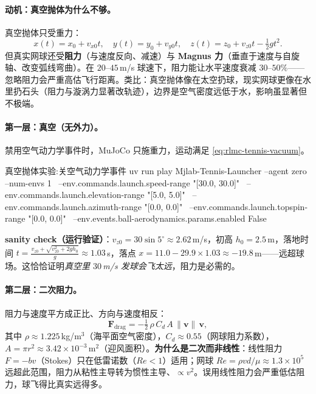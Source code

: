 \paragraph{动机：真空抛体为什么不够。}真空抛体只受重力：
\begin{equation}
x(t)=x_0+v_{x0}t,\quad y(t)=y_0+v_{y0}t,\quad z(t)=z_0+v_{z0}t-\tfrac12 g t^2.
\label{eq:rlmc-tennis-vacuum}
\end{equation}
但真实网球还受\textbf{阻力}（与速度反向、减速）与 \textbf{Magnus 力}（垂直于速度与自旋轴、改变弧线弯曲）。在 $20$--$45$\,m/s 球速下，阻力能让水平速度衰减 $30$--$50\%$——忽略阻力会严重高估飞行距离。类比：真空抛体像在太空扔球，现实网球更像在水里扔石头（阻力与漩涡力显著改轨迹），边界是空气密度远低于水，影响虽显著但不极端。

\paragraph{第一层：真空（无外力）。}禁用空气动力学事件时，MuJoCo 只施重力，运动满足 \eqref{eq:rlmc-tennis-vacuum}。

\begin{codebox}[bash]{真空抛体实验:关空气动力学事件}
uv run play Mjlab-Tennis-Launcher --agent zero --num-envs 1 \
  --env.commands.launch.speed-range "[30.0, 30.0]" \
  --env.commands.launch.elevation-range "[5.0, 5.0]" \
  --env.commands.launch.azimuth-range "[0.0, 0.0]" \
  --env.commands.launch.topspin-range "[0.0, 0.0]" \
  --env.events.ball-aerodynamics.params.enabled False
\end{codebox}

\textbf{sanity check（运行验证）}：$v_{z0}=30\sin5^\circ\approx2.62$\,m/s，初高 $h_0=2.5$\,m，落地时间 $t=\frac{v_{z0}+\sqrt{v_{z0}^2+2gh_0}}{g}\approx1.03$\,s，落点 $x=11.0-29.9\times1.03\approx-19.8$\,m——远超球场。这恰恰证明\emph{真空里 $30$\,m/s 发球会飞太远}，阻力是必需的。

\paragraph{第二层：二次阻力。}阻力与速度平方成正比、方向与速度相反：
\begin{equation}
\mathbf{F}_{\text{drag}}=-\tfrac12\,\rho\,C_d\,A\,\|\mathbf v\|\,\mathbf v,
\label{eq:rlmc-tennis-drag}
\end{equation}
其中 $\rho\approx1.225$\,kg/m$^3$（海平面空气密度），$C_d\approx0.55$（网球阻力系数），$A=\pi r^2\approx3.42\times10^{-3}$\,m$^2$（迎风面积）。\textbf{为什么是二次而非线性}：线性阻力 $F=-bv$（Stokes）只在低雷诺数（$Re<1$）适用；网球 $Re=\rho v d/\mu\approx1.3\times10^5$ 远超此范围，阻力从粘性主导转为惯性主导、$\propto v^2$。误用线性阻力会严重低估阻力，球飞得比真实远得多。

